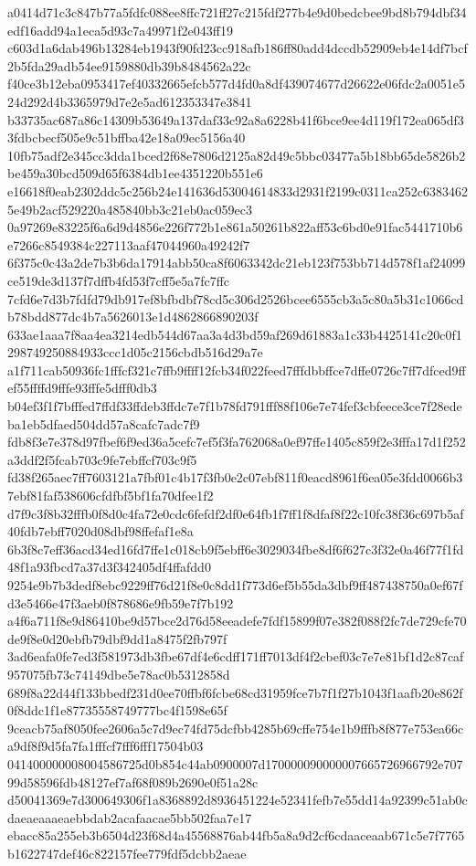 \documentclass[11pt,a4paper]{article}
\begin{document}
{a0414d71c3c847b77a5fdfc088ee8ffc721ff27c215fdf277b4e9d0bedcbee9bd8b794dbf34edf16add94a1eca5d93c7a49971f2e043ff19
c603d1a6dab496b13284eb1943f90fd23cc918afb186ff80add4dccdb52909eb4e14df7bcf2b5fda29adb54ee9159880db39b8484562a22c
f40ce3b12eba0953417ef40332665efcb577d4fd0a8df439074677d26622e06fdc2a0051e524d292d4b3365979d7e2e5ad612353347e3841
b33735ac687a86c14309b53649a137daf33c92a8a6228b41f6bce9ee4d119f172ea065df33fdbcbecf505e9c51bffba42e18a09ec5156a40
10fb75adf2e345cc3dda1bced2f68e7806d2125a82d49c5bbc03477a5b18bb65de5826b2be459a30bcd509d65f6384db1ee4351220b551e6
e16618f0eab2302ddc5c256b24e141636d53004614833d2931f2199c0311ca252c63834625e49b2acf529220a485840bb3c21eb0ac059ec3
0a97269e83225f6a6d9d4856e226f772b1e861a50261b822aff53c6bd0e91fac5441710b6e7266c8549384c227113aaf47044960a49242f7
6f375c0c43a2de7b3b6da17914abb50ca8f6063342dc21eb123f753bb714d578f1af24099ce519de3d137f7dffb4fd53f7cff5e5a7fc7ffc
7cfd6e7d3b7fdfd79db917ef8bfbdbf78cd5c306d2526bcee6555cb3a5c80a5b31c1066cdb78bdd877dc4b7a5626013e1d4862866890203f
633ae1aaa7f8aa4ea3214edb544d67aa3a4d3bd59af269d61883a1c33b4425141c20c0f1298749250884933ccc1d05c2156cbdb516d29a7e
a1f711cab50936fc1fffcf321c7ffb9ffff12fcb34f022feed7fffdbbffce7dffe0726c7ff7dfced9ffef55ffffd9fffe93fffe5dfff0db3
b04ef3f1f7bfffed7ffdf33ffdeb3ffdc7e7f1b78fd791fff88f106e7e74fef3cbfeece3ce7f28edeba1eb5dfaed504dd57a8cafc7adc7f9
fdb8f3e7e378d97fbef6f9ed36a5cefc7ef5f3fa762068a0ef97ffe1405c859f2e3fffa17d1f252a3ddf2f5fcab703c9fe7ebffcf703c9f5
fd38f265aec7ff7603121a7fbf01c4b17f3fb0e2c07ebf811f0eacd8961f6ea05e3fdd0066b37ebf81faf538606cfdfbf5bf1fa70dfee1f2
d7f9c3f8b32fffb0f8d0c4fa72e0cdc6fefdf2df0e64fb1f7ff1f8dfaf8f22c10fc38f36c697b5af40fdb7ebff7020d08dbf98ffefaf1e8a
6b3f8c7eff36acd34ed16fd7ffe1c018cb9f5ebff6e3029034fbe8df6f627c3f32e0a46f77f1fd48f1a93fbcd7a37d3f342405df4ffafdd0
9254e9b7b3dedf8ebc9229ff76d21f8e0c8dd1f773d6ef5b55da3dbf9ff487438750a0ef67fd3e5466e47f3aeb0f878686e9fb59e7f7b192
a4f6a711f8e9d86410be9d57bce2d76d58eeadefe7fdf15899f07e382f088f2fc7de729cfe70de9f8e0d20ebfb79dbf9dd1a8475f2fb797f
3ad6eafa0fe7ed3f581973db3fbe67df4e6cdff171ff7013df4f2cbef03c7e7e81bf1d2c87caf957075fb73c74149dbe5e78ac0b5312858d
689f8a22d44f133bbedf231d0ee70ffbf6fcbe68cd31959fce7b7f1f27b1043f1aafb20e862f0f8ddc1f1e87735558749777bc4f1598e65f
9ceacb75af8050fee2606a5c7d9ec74fd75dcfbb4285b69cffe754e1b9fffb8f877e753ea66ca9df8f9d5fa7fa1fffcf7fff6fff17504b03
041400000008004586725d0b854c44ab0900007d170000090000007665726966792e70799d58596fdb48127ef7af68f089b2690e0f51a28c
d50041369e7d300649306f1a8368892d8936451224e52341fefb7e55dd14a92399c51ab0cdaeaeaaaeaebbdab2acafaacae5bb502faa7e17
ebacc85a255eb3b6504d23f68d4a45568876ab44fb5a8a9d2cf6cdaaceaab671c5e7f7765b1622747def46c822157fee779fdf5dcbb2aeae
}
\end{document}
